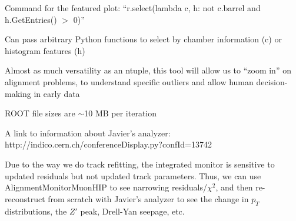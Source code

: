 \documentclass[compress]{beamer}
\begin{document}
\begin{notes}
\small
\item Command for the featured plot: ``r.select(lambda c, h: not c.barrel and h.GetEntries() $>$ 0)''
\item Can pass arbitrary Python functions to select by chamber information (c) or histogram features (h)
\item Almost as much versatility as an ntuple, this tool will allow us to
``zoom in'' on alignment problems, to understand specific outliers and
allow human decision-making in early data
\item ROOT file sizes are $\sim$10 MB per iteration
\item A link to information about Javier's analyzer: http://indico.cern.ch/conferenceDisplay.py?confId=13742
\item Due to the way we do track refitting, the integrated monitor is
sensitive to updated residuals but not updated track parameters.
Thus, we can use AlignmentMonitorMuonHIP to see narrowing
residuals/$\chi^2$, and then re-reconstruct from scratch with Javier's
analyzer to see the change in $p_T$ distributions, the $Z'$ peak,
Drell-Yan seepage, etc.
\end{notes}
\end{document}
